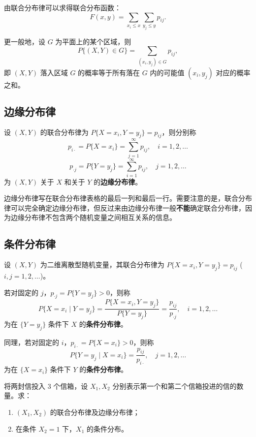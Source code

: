 \documentclass[lang=cn,11pt]{elegantbook}
\begin{document}
由联合分布律可以求得联合分布函数：
\[
F(x,y) = \sum_{x_i \leqslant x}\sum_{y_j \leqslant y}p_{ij}.
\]

更一般地，设 $G$ 为平面上的某个区域，则
\[
P\{(X,Y) \in G\} = \sum_{(x_i,y_j) \in G}p_{ij},
\]
即 $(X,Y)$ 落入区域 $G$ 的概率等于所有落在 $G$ 内的可能值 $(x_i, y_j)$ 对应的概率之和。

\subsection{边缘分布律}

\begin{definition}[边缘分布律] \label{def:marginal-pm}
设 $(X,Y)$ 的联合分布律为 $P\{X = x_i, Y = y_j\} = p_{ij}$，则分别称
\[
p_{i\cdot} = P\{X = x_i\} = \sum_{j=1}^{\infty}p_{ij}, \quad i = 1,2,\dots
\]
\[
p_{\cdot j} = P\{Y = y_j\} = \sum_{i=1}^{\infty}p_{ij}, \quad j = 1,2,\dots
\]
为 $(X,Y)$ 关于 $X$ 和关于 $Y$ 的\textbf{边缘分布律}。
\end{definition}

\begin{note}
边缘分布律写在联合分布律表格的最后一列和最后一行。需要注意的是，联合分布律可以完全确定边缘分布律，但反过来由边缘分布律一般\textbf{不能}确定联合分布律，因为边缘分布律不包含两个随机变量之间相互关系的信息。
\end{note}

\subsection{条件分布律}

\begin{definition}[条件分布律] \label{def:conditional-pm}
设 $(X,Y)$ 为二维离散型随机变量，其联合分布律为 $P\{X = x_i, Y = y_j\} = p_{ij}$ ($i,j = 1,2,\dots$)。

若对固定的 $j$，$p_{\cdot j} = P\{Y = y_j\} > 0$，则称
\[
P\{X = x_i \mid Y = y_j\} = \frac{P\{X = x_i, Y = y_j\}}{P\{Y = y_j\}} = \frac{p_{ij}}{p_{\cdot j}}, \quad i = 1,2,\dots
\]
为在 $\{Y = y_j\}$ 条件下 $X$ 的\textbf{条件分布律}。

同理，若对固定的 $i$，$p_{i\cdot} = P\{X = x_i\} > 0$，则称
\[
P\{Y = y_j \mid X = x_i\} = \frac{p_{ij}}{p_{i\cdot}}, \quad j = 1,2,\dots
\]
为在 $\{X = x_i\}$ 条件下 $Y$ 的\textbf{条件分布律}。
\end{definition}

\begin{exercise}\label{exer:3-2}
将两封信投入 3 个信箱，设 $X_1, X_2$ 分别表示第一个和第二个信箱投进的信的数量。求：
\begin{enumerate}
    \item[(1)] $(X_1, X_2)$ 的联合分布律及边缘分布律；
    \item[(2)] 在条件 $X_2 = 1$ 下，$X_1$ 的条件分布。
\end{enumerate}
\end{exercise}
\end{document}
